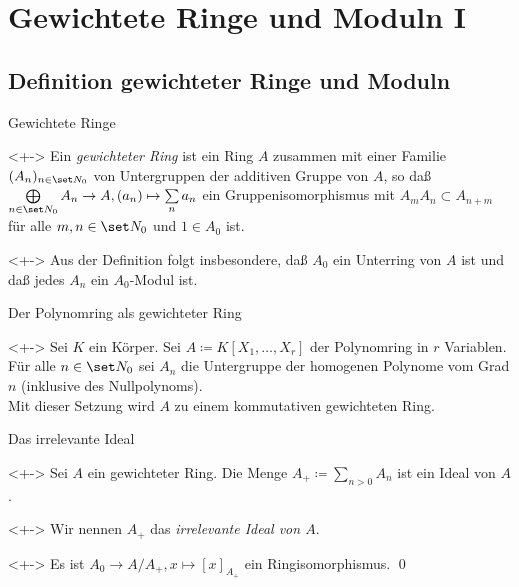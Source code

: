 \section{Gewichtete Ringe und Moduln I}

\subsection{Definition gewichteter Ringe und Moduln}

\begin{frame}{Gewichtete Ringe}
	\begin{definition}<+->
		Ein \emph{gewichteter Ring} ist ein Ring \(A\) zusammen mit einer
		Familie \((A_n)_{n \in \set N_0}\) von Untergruppen der additiven
		Gruppe von \(A\), so daß
		\(\bigoplus\limits_{n \in \set N_0} A_n \to A, (a_n) \mapsto
		\sum\limits_n a_n\) ein Gruppenisomorphismus mit
		\(A_m A_n \subset A_{n + m}\) für alle \(m, n \in \set N_0\)
                und \(1 \in A_0\) ist.
	\end{definition}
	\begin{visibleenv}<+->
		Aus der Definition folgt insbesondere, daß \(A_0\) ein Unterring
		von \(A\) ist und daß jedes \(A_n\) ein \(A_0\)-Modul ist.
	\end{visibleenv}
\end{frame}

\begin{frame}{Der Polynomring als gewichteter Ring}
	\begin{example}<+->
		Sei \(K\) ein Körper. Sei \(A \coloneqq K[X_1, \dotsc, X_r]\) der
		Polynomring in \(r\) Variablen. 
		\\
		Für alle \(n \in \set N_0\) sei \(A_n\) die Untergruppe der homogenen
		Polynome vom Grad \(n\) (inklusive des Nullpolynoms).
		\\
		Mit dieser Setzung wird \(A\) zu einem kommutativen gewichteten Ring.
	\end{example}
\end{frame}

\begin{frame}{Das irrelevante Ideal}
	\begin{visibleenv}<+->
		Sei \(A\) ein gewichteter Ring. Die Menge
		\(A_+ \coloneqq \sum\limits_{n > 0} A_n\) ist ein Ideal von \(A\).
	\end{visibleenv}
	\begin{notation}<+->
		Wir nennen \(A_+\) das \emph{irrelevante Ideal von \(A\)}.
	\end{notation}
	\begin{proposition}<+->
		Es ist \(A_0 \to A/A_+, x \mapsto [x]_{A_+}\) ein Ringisomorphismus.
		\qed
	\end{proposition}
\end{frame}

